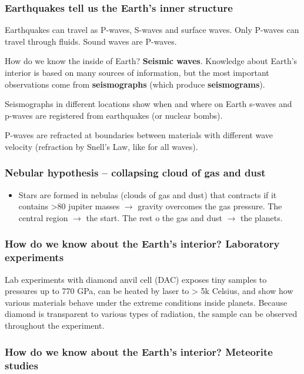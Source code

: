 \subsubsection{Earthquakes tell us the Earth's inner structure}

Earthquakes can travel as P-waves, S-waves and surface waves.
Only P-waves can travel through fluids. Sound waves are P-waves.

How do we know the inside of Earth? \textbf{Seismic waves}. Knowledge about
Earth's interior is based on many sources of information, but the most
important observations come from \textbf{seismographs} (which produce
\textbf{seismograms}).

Seismographs in different locations show when and where on Earth s-waves and
p-waves are registered from earthquakes (or nuclear bombs).

P-waves are refracted at boundaries between materials with different wave
velocity (refraction by Snell's Law, like for all waves).

\subsubsection{Nebular hypothesis -- collapsing cloud of gas and dust}

\begin{itemize}
    \item Stars are formed in nebulas (clouds of gas and dust) that contracts
        if it contains >80 jupiter masses $\rightarrow$ gravity overcomes
        the gas pressure. The central region $\rightarrow$ the start. The rest
        o the gas and dust $\rightarrow$ the planets.
\end{itemize}

\subsubsection{How do we know about the Earth's interior? Laboratory
experiments}

Lab experiments with diamond anvil cell (DAC) exposes tiny samples to pressures
up to 770 GPa, can be heated by laser to > 5k Celsius, and show how various
materials behave under the extreme conditions inside planets. Because diamond
is transparent to various types of radiation, the sample can be observed
throughout the experiment.

\subsubsection{How do we know about the Earth's interior? Meteorite studies}

